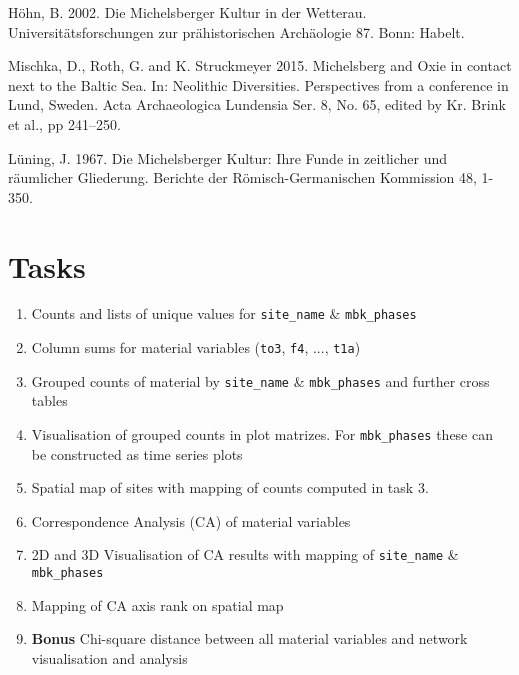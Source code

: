 \documentclass[a3, ruledsections, 8pt]{sciposter}
\begin{document}
\medskip

Höhn, B. 2002. Die Michelsberger Kultur in der Wetterau. Universitätsforschungen zur prähistorischen Archäologie 87. Bonn: Habelt.

Mischka, D., Roth, G. and K. Struckmeyer 2015. Michelsberg and Oxie in contact next to the Baltic Sea. In: Neolithic Diversities. Perspectives from a conference in Lund, Sweden. Acta Archaeologica Lundensia Ser. 8, No. 65, edited by Kr. Brink et al., pp 241–250.

Lüning, J. 1967. Die Michelsberger Kultur: Ihre Funde in zeitlicher und räumlicher Gliederung. Berichte der Römisch-Germanischen Kommission 48, 1-350.

\section{Tasks}

\begin{enumerate}
\item Counts and lists of unique values for \verb|site_name| \& \verb|mbk_phases|
\item Column sums for material variables (\verb|to3|, \verb|f4|, ..., \verb|t1a|)
\item Grouped counts of material by \verb|site_name| \& \verb|mbk_phases| and further cross tables
\item Visualisation of grouped counts in plot matrizes. For \verb|mbk_phases| these can be constructed as time series plots
\item Spatial map of sites with mapping of counts computed in task 3.
\item Correspondence Analysis (CA) of material variables
\item 2D and 3D Visualisation of CA results with mapping of \verb|site_name| \& \verb|mbk_phases|
\item Mapping of CA axis rank on spatial map
\item \textbf{Bonus} Chi-square distance between all material variables and network visualisation and analysis
\end{enumerate}


\end{document}

